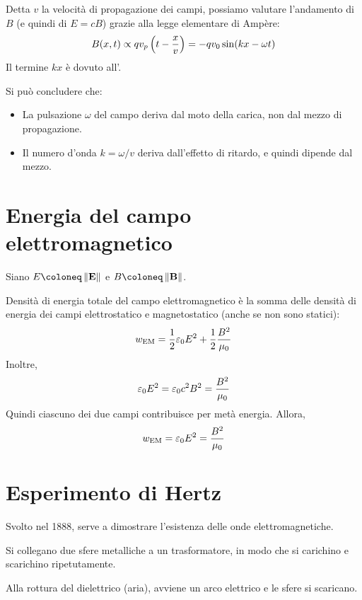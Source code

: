 Detta $v$ la velocità di propagazione dei campi, possiamo valutare l'andamento di $B$ (e quindi di $E = c B$) grazie alla legge elementare di Ampère:
\begin{equation}
    B(x, t) \propto q v_p\left( t - \frac{x}{v} \right) = - q v_0 \sin(k x - \omega t)
\end{equation}
Il termine $k x$ è dovuto all'.

Si può concludere che:
\begin{itemize}
    \item La pulsazione $\omega$ del campo deriva dal moto della carica, non dal mezzo di propagazione.
    \item Il numero d'onda $k = \omega / v$ deriva dall'effetto di ritardo, e quindi dipende dal mezzo.
\end{itemize}


\section{Energia del campo elettromagnetico}

Siano $E \coloneq \norm{\E}$ e $B \coloneq \norm{\B}$.

Densità di energia totale del campo elettromagnetico è la somma delle densità di energia dei campi elettrostatico e magnetostatico (anche se non sono statici):
\begin{equation}
    w_\mathrm{EM} = \frac{1}{2} \varepsilon_0 E^2 + \frac{1}{2} \frac{B^2}{\mu_0}
\end{equation}
Inoltre,
\begin{equation}
    \varepsilon_0 E^2 = \varepsilon_0 c^2 B^2 = \frac{B^2}{\mu_0}
\end{equation}
Quindi ciascuno dei due campi contribuisce per metà energia.
Allora,
\begin{equation}
    w_\mathrm{EM} = \varepsilon_0 E^2 = \frac{B^2}{\mu_0}
\end{equation}

\section{Esperimento di Hertz}

Svolto nel 1888, serve a dimostrare l'esistenza delle onde elettromagnetiche.

Si collegano due sfere metalliche a un trasformatore, in modo che si carichino e scarichino ripetutamente.

Alla rottura del dielettrico (aria), avviene un arco elettrico e le sfere si scaricano.

